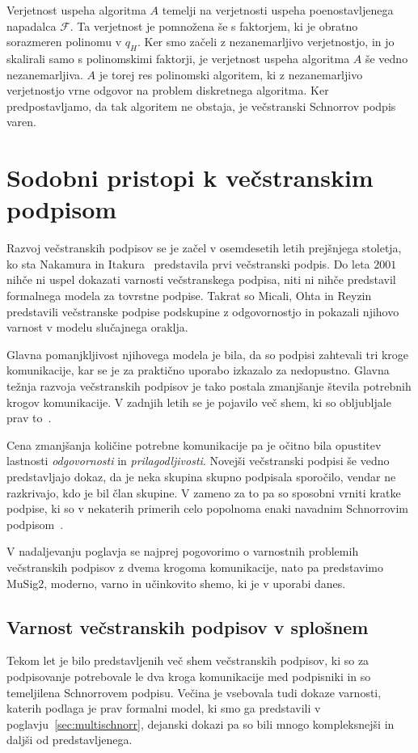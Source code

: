 \documentclass[isrm2, tisk]{fmfdelo}
\begin{document}
Verjetnost uspeha algoritma $A$ temelji na verjetnosti uspeha poenostavljenega napadalca $\mathcal{F}$.
Ta verjetnost je pomnožena še s faktorjem, ki je obratno sorazmeren polinomu v $q_H$. Ker smo
začeli z nezanemarljivo verjetnostjo, in jo skalirali samo s polinomskimi faktorji, je verjetnost
uspeha algoritma $A$ še vedno nezanemarljiva. $A$ je torej res polinomski algoritem, ki z
nezanemarljivo verjetnostjo vrne odgovor na problem diskretnega algoritma. Ker predpostavljamo, da
tak algoritem ne obstaja, je večstranski Schnorrov podpis varen.

\section{Sodobni pristopi k večstranskim podpisom}
\label{sec:sodobno}
Razvoj večstranskih podpisov se je začel v osemdesetih letih prejšnjega stoletja, ko sta Nakamura
in Itakura~\cite{itakura1983multi} predstavila prvi večstranski podpis. Do leta $2001$ nihče ni
uspel dokazati varnosti večstranskega podpisa, niti ni nihče predstavil formalnega modela za
tovrstne podpise. Takrat so Micali, Ohta in Reyzin~\cite{micali2001asm} predstavili večstranske
podpise podskupine z odgovornostjo in pokazali njihovo varnost v modelu slučajnega oraklja.

Glavna pomanjkljivost njihovega modela je bila, da so podpisi zahtevali tri kroge komunikacije, kar
se je za praktično uporabo izkazalo za nedopustno. Glavna težnja razvoja večstranskih podpisov je
tako postala zmanjšanje števila potrebnih krogov komunikacije. V zadnjih letih se je pojavilo več
shem, ki so obljubljale prav to~\cite{drijvers2019security, jonas2020musig2}.

Cena zmanjšanja količine potrebne komunikacije pa je očitno bila opustitev lastnosti \textit{odgovornosti}
in \textit{prilagodljivosti}. Novejši večstranski podpisi še vedno predstavljajo dokaz, da je neka
skupina skupno podpisala sporočilo, vendar ne razkrivajo, kdo je bil član skupine. V zameno za to
pa so sposobni vrniti kratke podpise, ki so v nekaterih primerih celo popolnoma enaki navadnim
Schnorrovim podpisom~\cite{jonas2020musig2}.

V nadaljevanju poglavja se najprej pogovorimo o varnostnih problemih večstranskih podpisov z dvema
krogoma komunikacije, nato pa predstavimo MuSig2, moderno, varno in učinkovito shemo, ki je v
uporabi danes.

\subsection{Varnost večstranskih podpisov v splošnem}
\label{sec:varnost}
Tekom let je bilo predstavljenih več shem večstranskih podpisov, ki so za podpisovanje potrebovale
le dva kroga komunikacije med podpisniki in so temeljilena Schnorrovem podpisu. Večina je vsebovala
tudi dokaze varnosti, katerih podlaga je prav formalni model, ki smo ga predstavili v
poglavju~\ref{sec:multischnorr}, dejanski dokazi pa so bili mnogo kompleksnejši in daljši od 
predstavljenega.
\end{document}
